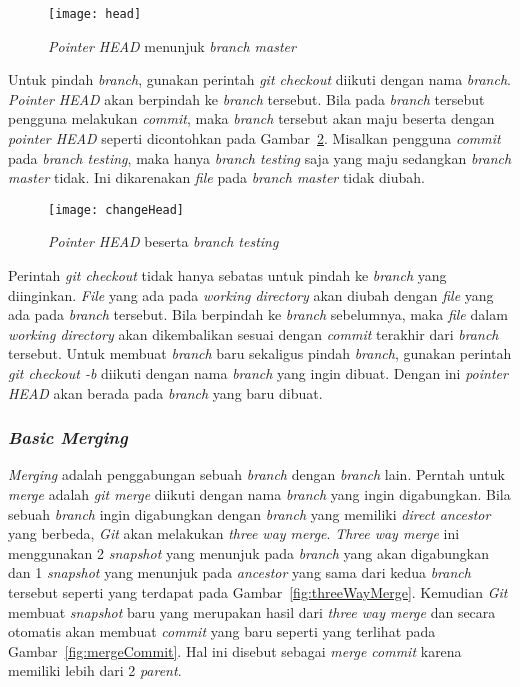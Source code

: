 \begin{figure}[H]
	\centering  
	\texttt{[image: head]}  
	\caption[\textit{Pointer HEAD} menunjuk \textit{branch master}]{\textit{Pointer HEAD} menunjuk \textit{branch master}}
	\label{fig:head} 
\end{figure}

Untuk pindah \textit{branch}, gunakan perintah \textit{git checkout} diikuti dengan nama \textit{branch}. \textit{Pointer HEAD} akan berpindah ke \textit{branch} tersebut. Bila pada \textit{branch} tersebut pengguna melakukan \textit{commit}, maka \textit{branch} tersebut akan maju beserta dengan \textit{pointer HEAD} seperti dicontohkan pada Gambar~\ref{fig:changeHead}. Misalkan pengguna \textit{commit} pada \textit{branch testing}, maka hanya \textit{branch testing} saja yang maju sedangkan \textit{branch master} tidak. Ini dikarenakan \textit{file} pada \textit{branch master} tidak diubah.\\

\begin{figure}[H]
	\centering  
	\texttt{[image: changeHead]}  
	\caption[\textit{Pointer HEAD} beserta \textit{branch testing}]{\textit{Pointer HEAD} beserta \textit{branch testing}}
	\label{fig:changeHead} 
\end{figure}

Perintah \textit{git checkout} tidak hanya sebatas untuk pindah ke \textit{branch} yang diinginkan. \textit{File} yang ada pada \textit{working directory} akan diubah dengan \textit{file} yang ada pada \textit{branch} tersebut. Bila berpindah ke \textit{branch} sebelumnya, maka \textit{file} dalam \textit{working directory} akan dikembalikan sesuai dengan \textit{commit} terakhir dari \textit{branch} tersebut. Untuk membuat \textit{branch} baru sekaligus pindah \textit{branch}, gunakan perintah \textit{git checkout -b} diikuti dengan nama \textit{branch} yang ingin dibuat. Dengan ini \textit{pointer HEAD} akan berada pada \textit{branch} yang baru dibuat. 

\subsubsection{\textit{Basic Merging}}
\textit{Merging} adalah penggabungan sebuah \textit{branch} dengan \textit{branch} lain. Perntah untuk \textit{merge} adalah \textit{git merge} diikuti dengan nama \textit{branch} yang ingin digabungkan. Bila sebuah \textit{branch} ingin digabungkan dengan \textit{branch} yang memiliki \textit{direct ancestor} yang berbeda, \textit{Git} akan melakukan \textit{three way merge}. \textit{Three way merge} ini menggunakan 2 \textit{snapshot} yang menunjuk pada \textit{branch} yang akan digabungkan dan 1 \textit{snapshot} yang menunjuk pada \textit{ancestor} yang sama dari kedua \textit{branch} tersebut seperti yang terdapat pada Gambar~\ref{fig:threeWayMerge}. Kemudian \textit{Git} membuat \textit{snapshot} baru yang merupakan hasil dari \textit{three way merge} dan secara otomatis akan membuat \textit{commit} yang baru seperti yang terlihat pada Gambar~\ref{fig:mergeCommit}. Hal ini disebut sebagai \textit{merge commit} karena memiliki lebih dari 2 \textit{parent}.

